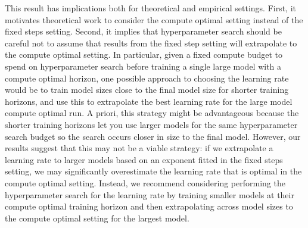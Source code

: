 This result has implications both for theoretical and empirical settings. First, it motivates theoretical work to consider the compute optimal setting instead of the fixed steps setting. Second, it implies that hyperparameter search should be careful not to assume that results from the fixed step setting will extrapolate to the compute optimal setting. In particular, given a fixed compute budget to spend on hyperparameter search before training a single large model with a compute optimal horizon, one possible approach to choosing the learning rate would be to train model sizes close to the final model size for shorter training horizons, and use this to extrapolate the best learning rate for the large model compute optimal run. A priori, this strategy might be advantageous because the shorter training horizons let you use larger models for the same hyperparameter search budget so the search occurs closer in size to the final model. However, our results suggest that this may not be a viable strategy: if we extrapolate a learning rate to larger models based on an exponent fitted in the fixed steps setting, we may significantly overestimate the learning rate that is optimal in the compute optimal setting. Instead, we recommend considering performing the hyperparameter search for the learning rate by training smaller models at their compute optimal training horizon and then extrapolating across model sizes to the compute optimal setting for the largest model.

